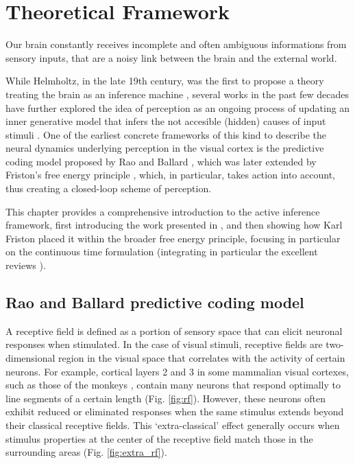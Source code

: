 \documentclass[10pt]{article}
\begin{document}
\section{Theoretical Framework} 
\label{Chapter1}

Our brain constantly receives incomplete and often ambiguous informations from sensory inputs, that are a noisy link between the brain and the external world. 

While Helmholtz, in the late 19th century, was the first to propose a theory treating the brain as an inference machine \citep{Helmholtz1925}, several works in the past few decades have further explored the idea of perception as an ongoing process of updating an inner generative model that infers the not accesible (hidden) causes of input stimuli \citep{Ballard1983, Knill2004, Doya2007}.
One of the earliest concrete frameworks of this kind to describe the neural dynamics underlying perception in the visual cortex is the predictive coding model proposed by Rao and Ballard \citep{Rao1999}, which was later extended by Friston's free energy principle \citep{friston2006, friston2010}, which, in particular, takes action into account, thus creating a closed-loop scheme of perception.

This chapter provides a comprehensive introduction to the active inference framework, first introducing the work presented in \citep{Rao1999}, and then showing how Karl Friston placed it within the broader free energy principle, focusing in particular on the continuous time formulation (integrating in particular the excellent reviews \citep{Buckley2017, Bogacz2017, Millidge2021}).

\subsection{Rao and Ballard predictive coding model}
\label{sec:rao_model}
A receptive field is defined \citep{Alonso2009} as a portion of sensory space that can elicit neuronal responses when stimulated. 
In the case of visual stimuli, receptive fields are two-dimensional region in the visual space that correlates with the activity of certain neurons. 
For example, cortical layers 2 and 3 in some mammalian visual cortexes, such as those of the monkeys \citep{Hubel1968}, contain many neurons that respond optimally to line segments of a certain length (Fig. \ref{fig:rf}). However, these neurons often exhibit reduced or eliminated responses when the same stimulus extends beyond their classical receptive fields. This ‘extra-classical’ effect generally occurs when stimulus properties at the center of the receptive field match those in the surrounding areas (Fig. \ref{fig:extra_rf}).
\end{document}
